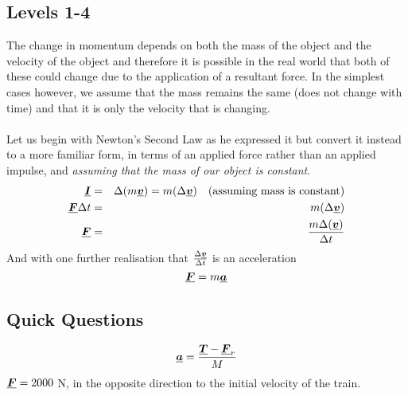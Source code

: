 \subsection*{Levels 1-4}
The change in momentum depends on both the mass of the object and the velocity of the object and therefore it is possible in the real world that both of these could change due to the application of a resultant force. In the simplest cases however, we assume that the mass remains the same (does not change with time) and that it is only the velocity that is changing.
\\
\\
Let us begin with Newton's Second Law as he expressed it but convert it instead to a more familiar form, in terms of an applied force rather than an applied impulse, and {\it assuming that the mass of our object is constant}.
\begin{eqnarray}
{\vtr I}&=&\Delta({m {\vtr v}}) =m(\Delta{\vtr v})\ \ \ (\mbox{assuming mass is constant})\nonumber\\
{\vtr F}\Delta t&=&m(\Delta{\vtr v}) \nonumber \\
{\vtr F}&=&\frac{m\Delta({\vtr v})}{\Delta t} \label{eqn:NIIF}
\end{eqnarray}
And with one further realisation that $\frac{\Delta {\mathit{\underline{\boldsymbol{v}}}}}{\Delta t}$  is an acceleration
\begin{equation}
{\mathit{\underline{\boldsymbol{F}}}}=m {\mathit{\underline{\boldsymbol{a}}}}
\end{equation}

\subsection*{Quick Questions}
  {
\begin{equation}
{\mathit{\underline{\boldsymbol{a}}}}=\frac{{\mathit{\underline{\boldsymbol{T}}}}-{\mathit{\underline{\boldsymbol{F}}}_r}}{M}\nonumber
\end{equation}}
 {${\mathit{\underline{\boldsymbol{F}}}}=2000$ N, in the opposite direction to the initial velocity of the train.}


